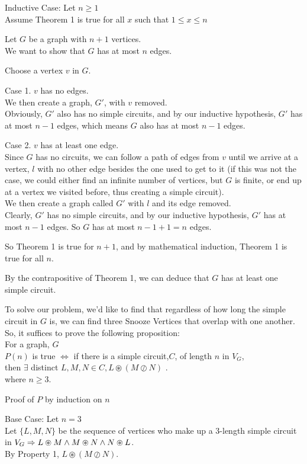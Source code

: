 \documentclass[fleqn]{article}
\begin{document}
Inductive Case: Let $n \geq 1$\\
Assume Theorem 1 is true for all $x$ such that $1 \leq x \leq n$

Let $G$ be a graph with $n+1$ vertices.\\
We want to show that $G$ has at most $n$ edges.

Choose a vertex $v$ in $G$.

Case 1. $v$ has no edges.\\
We then create a graph, $G'$, with $v$ removed.\\
Obviously, $G'$ also has no simple circuits, and by our inductive hypothesis, $G'$ has at most $n-1$ edges, which means $G$ also has at most $n-1$ edges.

Case 2. $v$ has at least one edge.\\
Since $G$ has no circuits, we can follow a path of edges from $v$ until we arrive at a vertex, $l$ with no other edge besides the one used to get to it (if this was not the case, we could either find an infinite number of vertices, but $G$ is finite, or end up at a vertex we visited before, thus creating a simple circuit).\\
We then create a graph called $G'$ with $l$ and its edge removed.
\\Clearly, $G'$ has no simple circuits, and by our inductive hypothesis, $G'$ has at most $n-1$ edges. So $G$ has at most $n-1+1=n$ edges.


So Theorem 1 is true for $n+1$, and by mathematical induction, Theorem 1 is true for all $n$.
 
By the contrapositive of Theorem 1, we can deduce that $G$ has at least one simple circuit.

To solve our problem, we'd like to find that regardless of how long the simple circuit in $G$ is, we can find three Snooze Vertices that overlap with one another.\\
So, it suffices to prove the following proposition:\\
For a graph, $G$\\
$P(n)$ is true $\Leftrightarrow$ if there is a simple circuit,$C$, of length $n$ in $V_G$,\\ then $\exists$ distinct $ L,M,N \in C,
                       L \circledast (M \oslash N)$ .\\
where $n \geq 3$.

Proof of $P$ by induction on $n$

Base Case: Let $n = 3$\\
Let $\lbrace L, M, N \rbrace$ be the sequence of vertices who make up a 3-length simple circuit in $V_G \Rightarrow\\
L \circledast M \wedge M \circledast N \wedge N \circledast L$.\\
By Property 1, $L \circledast (M \oslash N)$.
\end{document}
